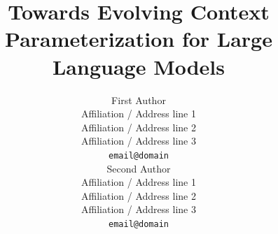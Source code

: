\documentclass[11pt]{article}
\title{Towards Evolving Context Parameterization for Large Language Models}
\author{First Author \\
  Affiliation / Address line 1 \\
  Affiliation / Address line 2 \\
  Affiliation / Address line 3 \\
  \texttt{email@domain} \\\And
  Second Author \\
  Affiliation / Address line 1 \\
  Affiliation / Address line 2 \\
  Affiliation / Address line 3 \\
  \texttt{email@domain} \\}
\begin{document}
\maketitle
\raggedbottom






\raggedbottom




\flushbottom


% 


\clearpage
\appendix

\end{document}
